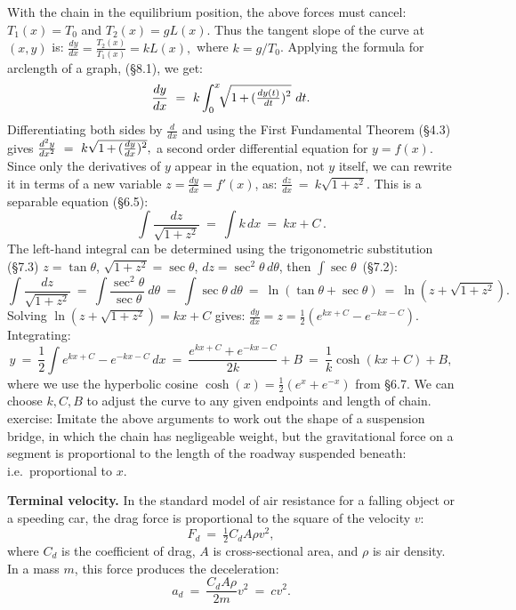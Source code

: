\documentclass[11pt]{article}
\begin{document}
With the chain in the equilibrium position,  the above forces must cancel:
$T_1(x)=T_0$ and $T_2(x) = g L(x)$. 
Thus the tangent slope of the curve at $(x,y)$ is:
$
\frac{dy}{dx} = \frac{T_2(x)}{T_1(x)}= k L(x),
$
where $k=g/T_0$.  Applying the formula for arclength of a graph,
(\S8.1), we get:
$$
\frac{dy}{dx} \ =\ k\int_0^x\!\!  \sqrt{\vphantom{|^M}\smash{
1\,{+}\,(\tfrac{dy(t)}{dt})^{2}}}\ dt.
$$
Differentiating both sides by $\frac{d}{dx}$ and using the First Fundamental Theorem (\S4.3) 
gives
$
\frac{d^2y}{dx^2} \ =\ k  \sqrt{\vphantom{m^2}\smash{
1\,{+}\,(\tfrac{dy}{dx})^{2}}},
$
a second order differential equation for $y=f(x)$.
Since only the derivatives of $y$ appear in the equation, not $y$ itself,
we can rewrite it in terms of a new variable $z=\frac{dy}{dx}=f'(x)$, as:
$\frac{dz}{dx} \ =\ k\sqrt{1{+}z^2}$. This is a separable equation (\S6.5):
$$
\int\! \frac{dz}{\sqrt{1{+}z^2}} \ =\ \int k\, dx \ =\  k x + C\,.
$$
The left-hand integral can be determined using the trigonometric substitution (\S7.3)
$z = \tan\theta$, $\sqrt{1{+}z^2}=\sec\theta$, $dz=\sec^2\!\theta\,d\theta$, 
then $\int\!\sec\theta$\, (\S7.2):
$$
\int\! \frac{dz}{\sqrt{1{+}z^2}} \ =\ \int\frac{\sec^2\!\theta}{\sec\theta}\ d\theta
\ =\ \int\sec\theta\ d\theta \ =\ \ln(\tan\theta + \sec\theta)
\ =\ \ln(z+\sqrt{1{+}z^2}).
$$
Solving $\ln(z+\sqrt{1{+}z^2}) = kx + C$ gives: $\frac{dy}{dx}=z = \frac12(e^{kx+C}-e^{-kx-C})$. Integrating:
$$
y \ =\ \frac12\int e^{kx+C}{-}e^{-kx-C}\,dx \ =\ 
\frac{e^{kx+C}+e^{-kx-C}}{2k}+B
\ =\ \frac1k \cosh(kx{+}C) + B,
$$
where we use the hyperbolic cosine $\cosh(x) = \frac12(e^x+e^{-x})$ from \S6.7.
We can choose $k,C,B$ to adjust the curve to any given endpoints and length of chain.
\\[.5em]
{\sc exercise:} Imitate the above arguments 
to work out the shape of a suspension bridge, 
in which the chain has negligeable weight, 
but the gravitational force on a segment 
is proportional to the length of the roadway
suspended beneath: i.e.~proportional to $x$.

\pagebreak

\noindent
{\bf Terminal velocity.} In the standard model of air resistance for a falling object 
or a speeding car, the drag force is proportional to the square of the velocity $v$:
$$
F_d \ =\  \tfrac12 C_d A\rho v^2,
$$
where $C_d$ is  the coefficient of drag, $A$ is cross-sectional area,
and $\rho$ is air density.
In a mass $m$, this force produces the deceleration: 
$$a_d \ =\ \frac{C_d A\rho}{2m} v^2 \ =\ cv^2.$$
\end{document}
